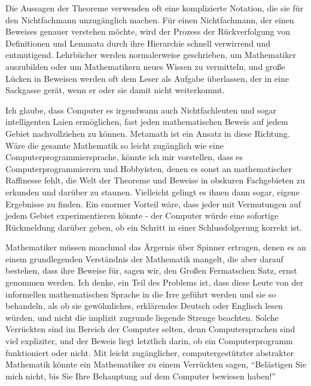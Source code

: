 Die Aussagen der Theoreme verwenden oft eine komplizierte Notation, die sie für den Nichtfachmann unzugänglich machen.  Für einen Nichtfachmann, der einen Beweises genauer verstehen möchte, wird der Prozess der Rückverfolgung von Definitionen und Lemmata durch ihre Hierarchie schnell verwirrend und entmutigend.  Lehrbücher werden normalerweise geschrieben, um Mathematiker auszubilden oder um Mathematikern neues Wissen zu vermitteln, und große Lücken in Beweisen werden oft dem Leser als Aufgabe überlassen, der in eine Sackgasse gerät, wenn er oder sie damit nicht weiterkommt.

Ich glaube, dass Computer es irgendwann auch Nichtfachleuten und sogar intelligenten Laien ermöglichen, fast jeden mathematischen Beweis auf jedem Gebiet nachvollziehen zu können.
Metamath ist ein Ansatz in diese Richtung.  Wäre die gesamte Mathematik so leicht zugänglich wie eine Computerprogrammiersprache, könnte ich mir vorstellen, dass es Computerprogrammierern und Hobbyisten, denen es sonst an mathematischer Raffinesse fehlt, die Welt der Theoreme und Beweise in obskuren Fachgebieten zu erkunden und darüber zu staunen.  Vielleicht gelingt es ihnen dann sogar, eigene Ergebnisse zu finden.  Ein enormer Vorteil wäre, dass jeder mit Vermutungen auf jedem Gebiet experimentieren könnte - der Computer würde eine sofortige Rückmeldung darüber geben, ob ein Schritt in einer Schlussfolgerung korrekt ist.

Mathematiker müssen manchmal das Ärgernis über Spinner ertragen, denen es an einem grundlegenden Verständnis der Mathematik mangelt, die aber darauf bestehen, dass ihre Beweise für, sagen wir, den Großen Fermatschen Satz, ernst genommen werden.  Ich denke, ein Teil des Problems ist, dass diese Leute von der informellen mathematischen Sprache in die Irre geführt werden und sie so behandeln, als ob sie gewöhnliches, erklärendes Deutsch oder Englisch lesen würden, und nicht die implizit zugrunde liegende Strenge beachten.  Solche Verrückten sind im Bereich der Computer selten, denn Computersprachen sind viel expliziter, und der Beweis liegt letztlich darin, ob ein Computerprogramm funktioniert oder nicht.  Mit leicht zugänglicher, computergestützter abstrakter Mathematik könnte ein Mathematiker zu einem Verrückten sagen, "`Belästigen Sie mich nicht, bis Sie Ihre Behauptung auf dem Computer bewiesen haben!"'

\vspace{-0.5em}

